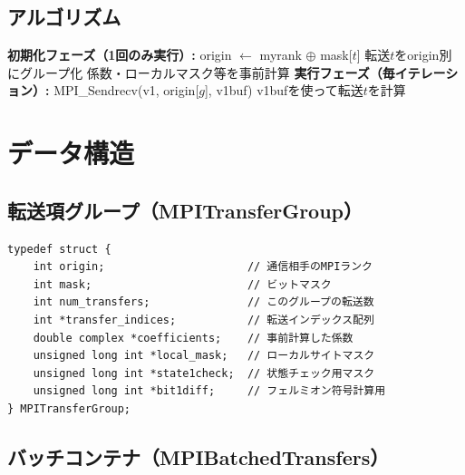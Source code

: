\documentclass[11pt,a4paper]{article}
\begin{document}
\subsection{アルゴリズム}

\begin{algorithm}
\caption{MPIバッチ処理アルゴリズム}
\begin{algorithmic}[1]
\State \textbf{初期化フェーズ（1回のみ実行）:}
    \State origin $\leftarrow$ myrank $\oplus$ mask[$t$]
    \State 転送$t$をorigin別にグループ化
    \State 係数・ローカルマスク等を事前計算
\EndFor
\State
\State \textbf{実行フェーズ（毎イテレーション）:}
    \State MPI\_Sendrecv(v1, origin[$g$], v1buf) 
        \State v1bufを使って転送$t$を計算 
    \EndFor
\EndFor
\end{algorithmic}
\end{algorithm}

\section{データ構造}

\subsection{転送項グループ（MPITransferGroup）}

\begin{lstlisting}[caption=MPITransferGroup構造体]
typedef struct {
    int origin;                      // 通信相手のMPIランク
    int mask;                        // ビットマスク
    int num_transfers;               // このグループの転送数
    int *transfer_indices;           // 転送インデックス配列
    double complex *coefficients;    // 事前計算した係数
    unsigned long int *local_mask;   // ローカルサイトマスク
    unsigned long int *state1check;  // 状態チェック用マスク
    unsigned long int *bit1diff;     // フェルミオン符号計算用
} MPITransferGroup;
\end{lstlisting}

\subsection{バッチコンテナ（MPIBatchedTransfers）}
\end{document}
